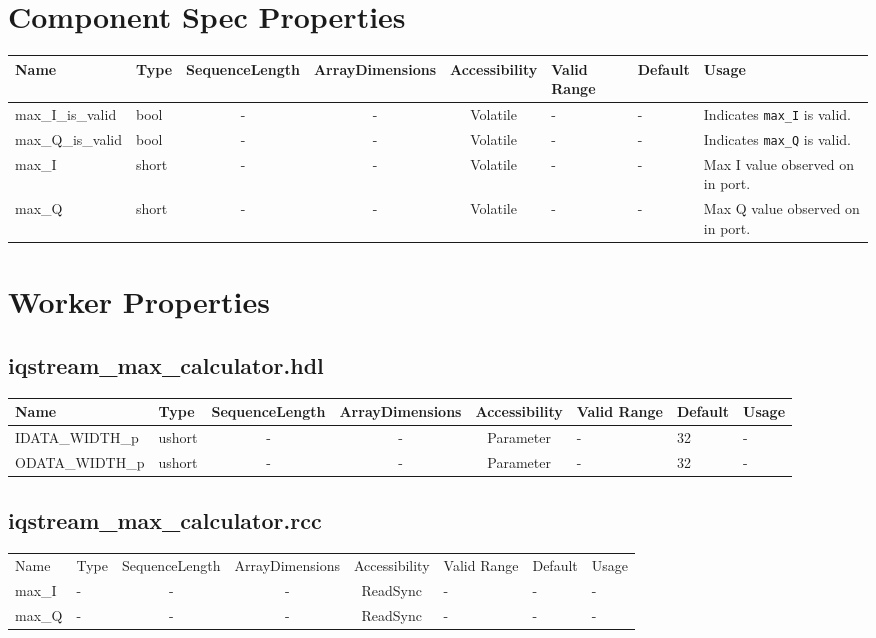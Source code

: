 \documentclass{article}
\def\comp{temp}
\def\comp{iqstream\_max\_calculator}
\def\comp{iqstream\_max\_calculator}
\begin{document}
\begin{landscape}
	\section*{Component Spec Properties}
	\begin{scriptsize}
\begin{tabular}{|p{3cm}|p{1.5cm}|c|c|c|p{1.5cm}|p{1cm}|p{6cm}|}
\hline
\rowcolor{blue}
Name                 & Type   & SequenceLength & ArrayDimensions & Accessibility       & Valid Range & Default & Usage
\\
\hline
max\_I\_is\_valid & bool  & - & - & Volatile & -  &- & Indicates \verb+max_I+ is valid.
\\
\hline
max\_Q\_is\_valid & bool  & - & - & Volatile & -  &- & Indicates \verb+max_Q+ is valid.
\\
\hline
max\_I & short  & - & - & Volatile & -  &- & Max I value observed on in port.
\\
\hline
max\_Q & short  & - & - & Volatile & -  &- & Max Q value observed on in port.
\\
\hline
\end{tabular}
	\end{scriptsize}

	\section*{Worker Properties}
	\subsection*{\comp.hdl}
	\begin{scriptsize}
\begin{tabular}{|p{3cm}|p{1.5cm}|c|c|c|p{1.5cm}|p{1cm}|p{6cm}|}
\hline
\rowcolor{blue}
Name                 & Type   & SequenceLength & ArrayDimensions & Accessibility       & Valid Range & Default & Usage
\\
\hline
IDATA\_WIDTH\_p & ushort & - & - & Parameter & -  & 32 & -
\\
\hline
ODATA\_WIDTH\_p & ushort & - & - & Parameter & -  & 32 & -
\\
\hline
\end{tabular}
	\subsection*{\comp.rcc}
\begin{tabular}{|p{3cm}|p{1.5cm}|c|c|c|p{1.5cm}|p{1cm}|p{5cm}|}
\hline
\rowcolor{blue}
Name                 & Type   & SequenceLength & ArrayDimensions & Accessibility       & Valid Range & Default & Usage
\\
max\_I & - & - & - & ReadSync & -  &- & -
\\
\hline
max\_Q & - & - & - & ReadSync & -  &- & -
\\
\hline
\end{tabular}
	\end{scriptsize}


\end{landscape}
\end{document}
